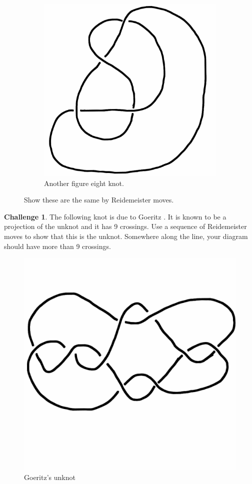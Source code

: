 \documentclass[12pt,letterpaper]{article}
\theoremstyle{definition}
\newtheorem*{challenge}{Challenge}
\begin{document}
\begin{figure}[h]
\begin{subfigure}{.3\textwidth}
        \includegraphics[width=\textwidth]{knotpics/9SeptQ3b.png}
        \caption{Another figure eight knot.}
    \end{subfigure}
    \caption{Show these are the same by Reidemeister moves.}
\end{figure}







\begin{challenge}
The following knot is due to Goeritz \cite{G}. It is known to be a projection of the unknot and it has 9 crossings.
Use a sequence of Reidemeister moves to show that this is the unknot.
Somewhere along the line, your diagram should have more than 9 crossings.
\end{challenge}

\begin{figure}[h]
    \centering
    \includegraphics[width=.4\textwidth]{knotpics/goeritz.png}
    \caption{Goeritz's unknot}
\end{figure}
\end{document}
